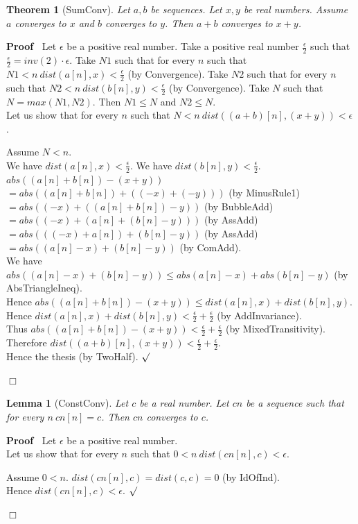 \documentclass{article}
\newenvironment{forthel}{\begin{leftbar}}{\end{leftbar}}
\newenvironment{proof}{\noindent\textbf{Proof\ }}{\hspace*{\fill}$\Box$\medskip}
\newenvironment{subproof}{\begin{list}{}{}
		\item[\text{Proof}]}{\hfill $\surd$ \end{list}}
\newtheorem{lemma}{Lemma}
\newtheorem{theorem}{Theorem}
\newcommand{\plusone}{+}
\newcommand{\halfeps}{\frac{\epsilon}{2}}
\newcommand{\dotequal}{=}
\begin{document}
\begin{forthel}
	\begin{theorem}[SumConv]
	Let $a,b$ be sequences. Let $x,y$ be real numbers. Assume $a$ converges to $x$ and $b$ converges to $y$.
	Then $a \plusone b$ converges to $x + y$.
	\end{theorem}
	\begin{proof}
	Let $\epsilon$ be a positive real number.
	Take a positive real number $\halfeps$ such that $\halfeps = inv(2) \cdot \epsilon$.
	Take $N1$ such that for every $n$ such that \linebreak $N1 < n \ dist(a[n],x) < \halfeps$ (by Convergence).
	Take $N2$ such that for every $n$ such that $N2 < n \ dist(b[n],y) < \halfeps$ (by Convergence).
	Take $N$ such that $N = max(N1,N2)$.
	Then $N1 \leq N$ and $N2 \leq N$.
	\\Let us show that for every $n$ such that $N < n \ dist((a \plusone b)[n],(x+y)) < \epsilon$.
	\begin{subproof}
	Assume $N < n$.
	\\We have $dist(a[n],x) < \halfeps$.
	We have $dist(b[n],y) < \halfeps$.
	\\$abs((a[n] + b[n]) - (x + y))$ 
	\\$\dotequal abs((a[n] + b[n]) + ((-x) + (-y)))$ (by MinusRule1)
	\\$\dotequal abs((-x) + ((a[n] + b[n]) - y))$ (by BubbleAdd)
	\\$\dotequal abs((-x) + (a[n] + (b[n] - y)))$ (by AssAdd)
	\\$\dotequal abs(((-x) + a[n]) + (b[n] - y))$ (by AssAdd)
	\\$\dotequal abs((a[n] - x) + (b[n] - y))$ (by ComAdd).
		\\
		
		We have $abs((a[n] - x) + (b[n] - y)) \leq abs(a[n] - x) + abs(b[n] - y)$  (by AbsTriangleIneq).
	\\Hence $abs((a[n] + b[n]) - (x + y)) \leq dist(a[n],x) + dist(b[n],y)$.
	\\Hence $dist(a[n],x) + dist(b[n],y) < \halfeps + \halfeps$ (by AddInvariance).
	\\Thus $abs((a[n] + b[n]) - (x + y)) < \halfeps + \halfeps$ (by MixedTransitivity).
	\\Therefore $dist((a \plusone b)[n],(x + y)) < \halfeps + \halfeps$.
	\\Hence the thesis (by TwoHalf).
	\end{subproof}
	\end{proof}
	
	\begin{lemma}[ConstConv]
	Let $c$ be a real number. Let $cn$ be a sequence such that for every $n \ cn[n] = c$.
	Then $cn$ converges to $c$.
	\end{lemma}
	\begin{proof}
	Let $\epsilon$ be a positive real number.
	\\Let us show that for every $n$ such that $0 < n \ dist(cn[n],c) < \epsilon$.
	\begin{subproof}
	Assume $0 < n$.
	$dist(cn[n],c) = dist(c,c) = 0$ (by IdOfInd).
	\\Hence $dist(cn[n],c) < \epsilon$.
	\end{subproof}
	\end{proof}
	

\end{forthel}
\end{document}
